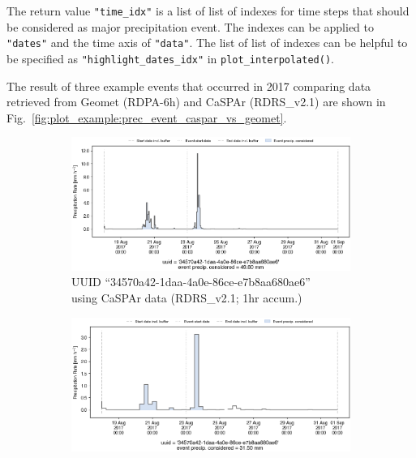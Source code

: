\documentclass[10pt,a4paper,titlepage,parskip]{scrartcl}
\begin{document}
\vspace*{-0.3cm}
The return value \texttt{"time\_idx"} is a list of list of indexes for time steps that should be considered as major precipitation event. The indexes can be applied to \texttt{"dates"} and the time axis of \texttt{"data"}. The list of list of indexes can be helpful to be specified as \texttt{"highlight\_dates\_idx"} in \texttt{plot\_interpolated()}.

The result of three example events that occurred in 2017 comparing data retrieved from Geomet (RDPA-6h) and CaSPAr (RDRS\_v2.1) are shown in Fig.~\ref{fig:plot_example:prec_event_caspar_vs_geomet}.
\vfill
\pagebreak
\newpage

\begin{figure}[h!]
	\begin{subfigure}[a]{0.48\textwidth}
		\centering
		\includegraphics[width=\linewidth]{figures/compare_Geomet_CaSPAr/interpolated_at_stations_occurrence_883_identified-timesteps_RDRS_v2.1.png}
		\caption{UUID ``34570a42-1daa-4a0e-86ce-e7b8aa680ae6''\\using CaSPAr data (RDRS\_v2.1; 1hr accum.)}
	\end{subfigure}
	\hspace*{0.05\linewidth}
	\begin{subfigure}[a]{0.48\textwidth}
		\centering
		\includegraphics[width=\linewidth]{figures/compare_Geomet_CaSPAr/interpolated_at_stations_occurrence_883_identified-timesteps_rdpa_10km_6f.png}

\end{subfigure}
\end{figure}
\end{document}
